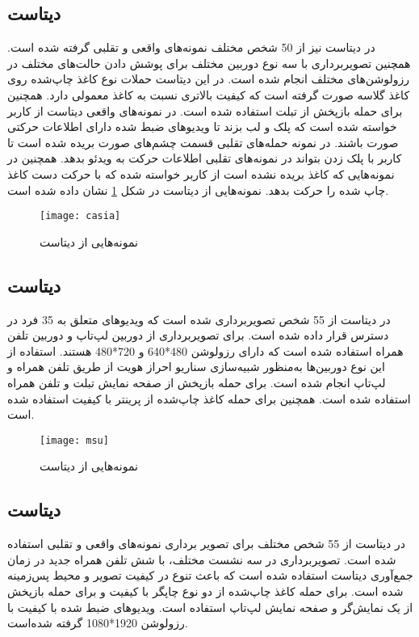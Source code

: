 \subsection{دیتاست }
در دیتاست
  \cite{zhang2012face}
نیز از 50 شخص مختلف نمونه‌های واقعی و تقلبی گرفته شده است. همچنین تصویربرداری با سه نوع دوربین مختلف برای پوشش دادن حالت‌های مختلف در رزولوشن‌های مختلف انجام شده است. در این دیتاست حملات نوع کاغذ چاپ‌شده روی کاغذ گلاسه صورت گرفته است که کیفیت بالاتری نسبت به کاغذ معمولی دارد. همچنین برای حمله بازپخش از تبلت استفاده شده است. در نمونه‌های واقعی دیتاست از کاربر خواسته شده است که پلک و لب بزند تا ویدیوهای ضبط شده دارای اطلاعات حرکتی صورت باشند. در نمونه حمله‌های تقلبی قسمت چشم‌های صورت بریده شده است تا کاربر با پلک زدن بتواند در نمونه‌های تقلبی اطلاعات حرکت به ویدئو بدهد. همچنین در نمونه‌هایی که کاغذ بریده نشده است از کاربر خواسته شده که با حرکت دست کاغذ چاپ شده را حرکت بدهد. نمونه‌هایی از دیتاست  در شکل 
\ref{fig:casia}
نشان داده شده است.

 \begin{figure}[h]
	\centerline{\texttt{[image: casia]}}
	\caption{نمونه‌هایی از دیتاست  \cite{zhang2012face} }
	\label{fig:casia}
\end{figure}

\subsection{دیتاست }
در دیتاست 
\cite{wen2015face}
 از 55 شخص تصویربرداری شده است که ویدیوهای متعلق به 35 فرد در دسترس قرار داده شده است. برای تصویربرداری از دوربین لپ‌تاپ و دوربین تلفن همراه استفاده شده است که دارای رزولوشن 480*640 و 720*480 هستند. استفاده از این نوع دوربین‌ها به‌منظور شبیه‌سازی سناریو احراز هویت از طریق تلفن همراه و لپ‌تاپ انجام شده است. برای حمله باز‌پخش از صفحه نمایش تبلت و تلفن همراه استفاده شده است. همچنین برای حمله کاغذ چاپ‌شده از پرینتر با کیفیت استفاده شده است.

 \begin{figure}[h]
	\centerline{\texttt{[image: msu]}}
	\caption{نمونه‌هایی از دیتاست  \cite{wen2015face} }
	\label{fig:msu}
\end{figure}

\subsection{دیتاست }
در دیتاست 
\cite{boulkenafet2017oulu}
از 55 شخص مختلف برای تصویر برداری نمونه‌های واقعی و تقلبی استفاده شده است. تصویربرداری در سه نشست مختلف، با شش تلفن همراه جدید در زمان جمع‌آوری دیتاست استفاده شده است که باعث تنوع در کیفیت تصویر و محیط پس‌زمینه شده است. برای حمله کاغذ چاپ‌شده از دو نوع چاپگر با کیفیت و برای حمله بازپخش از یک نمایش‌گر و صفحه نمایش لپ‌تاپ استفاده است. ویدیوهای ضبط شده با کیفیت  با رزولوشن 1920*1080 گرفته شده‌است.

